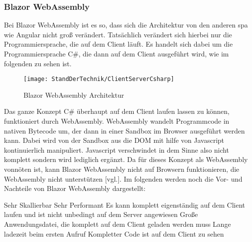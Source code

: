 \subsubsection{Blazor WebAssembly}
Bei Blazor WebAssembly ist es so, dass sich die Architektur von den anderen \ac{spa} wie Angular
nicht groß verändert. Tatsächlich verändert sich hierbei nur die Programmiersprache, die auf dem
Client läuft. Es handelt sich dabei um die Programmiersprache C\#, die dann auf dem Client
ausgeführt wird, wie im folgenden zu sehen ist.
\begin{figure}[h]
    \centering
    \texttt{[image: StandDerTechnik/ClientServerCsharp]}
    \caption[Blazor WebAssembly Architektur]{Blazor WebAssembly Architektur}
    \label{img:clientservercsharp}
\end{figure}
\newline
\newline
Das ganze Konzept C\# überhaupt auf dem Client laufen lassen zu können, funktioniert durch
WebAssembly. WebAssembly wandelt Programmcode in nativen Bytecode um, der dann in einer Sandbox
im Browser ausgeführt werden kann. Dabei wird von der Sandbox aus die DOM mit hilfe von
Javascript kontinuierlich manipuliert. Javascript verschwindet in dem Sinne also nicht komplett
sondern wird lediglich ergänzt.
Da für dieses Konzept als WebAssembly vonnöten ist, kann Blazor WebAssembly nicht auf Browsern
funktionieren, die WebAssembly nicht unterstützen \cite{HierKommtBlazor}[vgl.].
\newline
\newline
Im folgenden werden noch die Vor- und Nachteile von Blazor WebAssembly dargestellt:
\begin{itemize}
    \pro Sehr Skallierbar
    \pro Sehr Performant
    \pro Es kann komplett eigenständig auf dem Client laufen und ist nicht unbedingt auf dem
    Server angewiesen
    \con Große Anwendungsdatei, die komplett auf dem Client geladen werden muss
    \con Lange ladezeit beim ersten Aufruf
    \con Kompletter Code ist auf dem Client zu sehen
\end{itemize}


